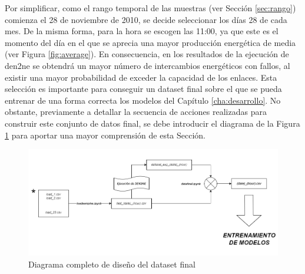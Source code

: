 Por simplificar, como el rango temporal de las muestras (ver Sección \ref{sec:rango}) comienza el 28 de noviembre de 2010, se decide seleccionar los días 28 de cada mes. De la misma forma, para la hora se escogen las 11:00, ya que este es el momento del día en el que se aprecia una mayor producción energética de media (ver Figura \ref{fig:average}). En consecuencia, en los resultados de la ejecución de \gls{den2ne} se obtendrá un mayor número de intercambios energéticos con fallos, al existir una mayor probabilidad de exceder la capacidad de los enlaces. Esta selección es importante para conseguir un dataset final sobre el que se pueda entrenar de una forma correcta los modelos del Capítulo \ref{cha:desarrollo}. No obstante, previamente a detallar la secuencia de acciones realizadas para construir este conjunto de datos final, se debe introducir el diagrama de la Figura \ref{fig:total2} para aportar una mayor comprensión de esta Sección. 

\begin{figure}[H]
    \centering
    \includegraphics[width=1\textwidth]{img/diseno/total2.png}
    \caption{Diagrama completo de diseño del dataset final}
    \label{fig:total2}
\end{figure}

\vspace{3mm}

